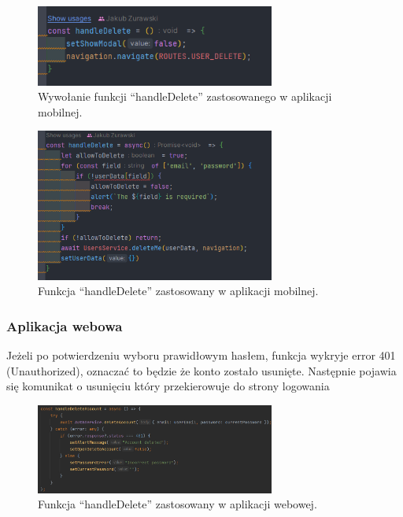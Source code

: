 \begin{figure}[H]
    \centering
    \includegraphics[width=0.7\textwidth]{chapters/chapter_8/screens/delete_user_mobile_1}
    \caption{Wywołanie funkcji “handleDelete” zastosowanego w aplikacji mobilnej.}
    \label{img:delete_user_mobile_1}
\end{figure}

\begin{figure}[H]
    \centering
    \includegraphics[width=0.7\textwidth]{chapters/chapter_8/screens/delete_user_mobile_2}
    \caption{Funkcja “handleDelete” zastosowany w aplikacji mobilnej.}
    \label{img:delete_user_mobile_2}
\end{figure}

\subsubsection{Aplikacja webowa}

Jeżeli po potwierdzeniu wyboru prawidłowym hasłem, funkcja wykryje error 401 (Unauthorized), oznaczać to będzie że konto zostało usunięte. Następnie pojawia się komunikat o usunięciu który przekierowuje do strony logowania

\begin{figure}[H]
    \centering
    \includegraphics[width=0.7\textwidth]{chapters/chapter_8/screens/delete_user_web}
    \caption{Funkcja “handleDelete” zastosowany w aplikacji webowej.}
    \label{img:delete_user_web}
\end{figure}

